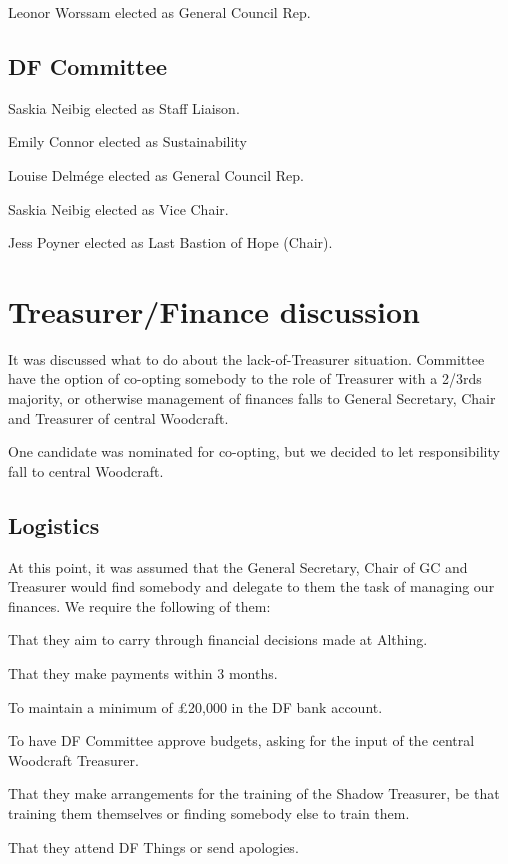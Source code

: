 \documentclass[a4paper, 12pt]{article}
\begin{document}
Leonor Worssam elected as General Council Rep.

\subsection{DF Committee}
Saskia Neibig elected as Staff Liaison.

Emily Connor elected as Sustainability

Louise Delmége elected as General Council Rep.

Saskia Neibig elected as Vice Chair.

Jess Poyner elected as Last Bastion of Hope (Chair).

\section{Treasurer/Finance discussion}
It was discussed what to do about the lack-of-Treasurer situation. Committee have the option of co-opting somebody to the role of Treasurer with a 2/3rds majority, or otherwise management of finances falls to General Secretary, Chair and Treasurer of central Woodcraft.

One candidate was nominated for co-opting, but we decided to let responsibility fall to central Woodcraft.

\subsection{Logistics}
At this point, it was assumed that the General Secretary, Chair of GC and Treasurer would find somebody and delegate to them the task of managing our finances. We require the following of them:
\begin{itemize*}
	\item That they aim to carry through financial decisions made at Althing.
	\item That they make payments within 3 months.
	\item To maintain a minimum of £20,000 in the DF bank account.
	\item To have DF Committee approve budgets, asking for the input of the central Woodcraft Treasurer.
	\item That they make arrangements for the training of the Shadow Treasurer, be that training them themselves or finding somebody else to train them.
	\item That they attend DF Things or send apologies.
\end{itemize*}
\end{document}
